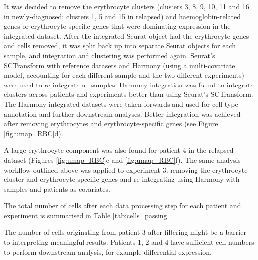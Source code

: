 It was decided to remove the erythrocyte clusters (clusters 3, 8, 9, 10, 11 and 16 in newly-diagnosed; clusters 1, 5 and 15 in relapsed) and haemoglobin-related genes or erythrocyte-specific genes that were dominating expression in the integrated dataset.
After the integrated Seurat object had the erythrocyte genes and cells removed, it was split back up into separate Seurat objects for each sample, and integration and clustering was performed again.
Seurat's SCTransform with reference datasets and Harmony (using a multi-covariate model, accounting for each different sample and the two different experiments) were used to re-integrate all samples.
Harmony integration was found to integrate clusters across patients and experiments better than using Seurat's SCTransform.
The Harmony-integrated datasets were taken forwards and used for cell type annotation and further downstream analyses.
Better integration was achieved after removing erythrocytes and erythrocyte-specific genes (see Figure \ref{fig:umap_RBC}d).

A large erythrocyte component was also found for patient 4 in the relapsed dataset (Figures \ref{fig:umap_RBC}e and \ref{fig:umap_RBC}f).
The same analysis workflow outlined above was applied to experiment 3, removing the erythrocyte cluster and erythrocyte-specific genes and re-integrating using Harmony with samples and patients as covariates.

The total number of cells after each data processing step for each patient and experiment is summarised in Table \ref{tab:cells_passing}.

The number of cells originating from patient 3 after filtering might be a barrier to interpreting meaningful results.
Patients 1, 2 and 4 have sufficient cell numbers to perform downstream analysis, for example differential expression.


